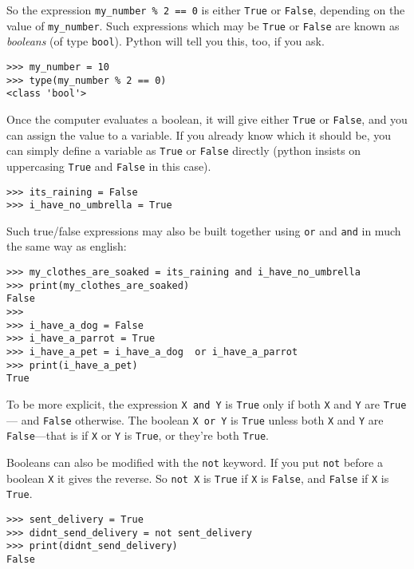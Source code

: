 So the expression \texttt{my\_number \% 2 == 0} is either \texttt{True} or \texttt{False}, depending on the value of \texttt{my\_number}. Such expressions which may be \texttt{True} or \texttt{False} are known as \emph{booleans} (of type \texttt{\textquotesingle bool\textquotesingle}). Python will tell you this, too, if you ask.

\begin{lstlisting}[numbers=none]
>>> my_number = 10
>>> type(my_number % 2 == 0)
<class 'bool'>
\end{lstlisting}

Once the computer evaluates a boolean, it will give either \texttt{True} or \texttt{False}, and you can assign the value to a variable. If you already know which it should be, you can simply define a variable as \texttt{True} or \texttt{False} directly (python insists on uppercasing \texttt{True} and \texttt{False} in this case).

\begin{lstlisting}[numbers=none]
>>> its_raining = False
>>> i_have_no_umbrella = True
\end{lstlisting}

Such true/false expressions may also be built together using \texttt{or} and \texttt{and} in much the same way as english:

\begin{lstlisting}[numbers=none]
>>> my_clothes_are_soaked = its_raining and i_have_no_umbrella
>>> print(my_clothes_are_soaked)
False
>>>
>>> i_have_a_dog = False
>>> i_have_a_parrot = True
>>> i_have_a_pet = i_have_a_dog  or i_have_a_parrot
>>> print(i_have_a_pet)
True
\end{lstlisting}

To be more explicit, the expression \texttt{X and Y} is \texttt{True} only if both \texttt{X} and \texttt{Y} are \texttt{True} --- and \texttt{False} otherwise. The boolean \texttt{X or Y} is \texttt{True} unless both \texttt{X} and \texttt{Y} are \texttt{False}—that is if \texttt{X} or \texttt{Y} is \texttt{True}, or they’re both \texttt{True}.

Booleans can also be modified with the \texttt{not} keyword. If you put \texttt{not} before a boolean \texttt{X} it gives the reverse. So \texttt{not X} is \texttt{True} if \texttt{X} is \texttt{False}, and \texttt{False} if \texttt{X} is \texttt{True}.

\begin{lstlisting}[numbers=none]
>>> sent_delivery = True
>>> didnt_send_delivery = not sent_delivery
>>> print(didnt_send_delivery)
False
\end{lstlisting}

